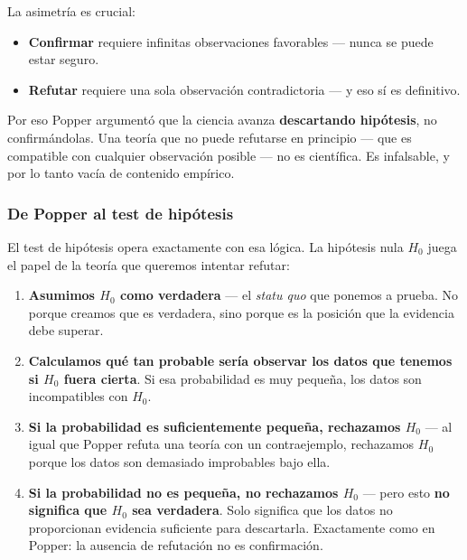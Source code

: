 \documentclass[12pt, a4paper]{book}
\numberwithin{equation}{chapter}
\begin{document}
La asimetr\'{i}a es crucial:

\begin{itemize}[leftmargin=2em]
	\item \textbf{Confirmar} requiere infinitas
	observaciones favorables --- nunca se puede
	estar seguro.
	\item \textbf{Refutar} requiere una sola
	observaci\'{o}n contradictoria --- y eso s\'{i}
	es definitivo.
\end{itemize}

Por eso Popper argument\'{o} que la ciencia avanza
\textbf{descartando hip\'{o}tesis}, no confirm\'{a}ndolas.
Una teor\'{i}a que no puede refutarse en principio ---
que es compatible con cualquier observaci\'{o}n posible
--- no es cient\'{i}fica. Es infalsable, y por lo tanto
vac\'{i}a de contenido emp\'{i}rico.

\subsubsection{De Popper al test de hip\'{o}tesis}

El test de hip\'{o}tesis opera exactamente con esa
l\'{o}gica. La hip\'{o}tesis nula $H_0$ juega el papel
de la teor\'{i}a que queremos intentar refutar:

\begin{enumerate}[label=\textbf{\arabic*.}]
	\item \textbf{Asumimos $H_0$ como verdadera} ---
	el \emph{statu quo} que ponemos a prueba. No
	porque creamos que es verdadera, sino porque es
	la posici\'{o}n que la evidencia debe superar.
	
	\item \textbf{Calculamos qu\'{e} tan probable
		ser\'{i}a observar los datos que tenemos si
		$H_0$ fuera cierta}. Si esa probabilidad es
	muy peque\~{n}a, los datos son incompatibles
	con $H_0$.
	
	\item \textbf{Si la probabilidad es suficientemente
		peque\~{n}a, rechazamos $H_0$} --- al igual que
	Popper refuta una teor\'{i}a con un contraejemplo,
	rechazamos $H_0$ porque los datos son demasiado
	improbables bajo ella.
	
	\item \textbf{Si la probabilidad no es peque\~{n}a,
		no rechazamos $H_0$} --- pero esto \textbf{no
		significa que $H_0$ sea verdadera}. Solo significa
	que los datos no proporcionan evidencia suficiente
	para descartarla. Exactamente como en Popper: la
	ausencia de refutaci\'{o}n no es confirmaci\'{o}n.
\end{enumerate}
\end{document}
